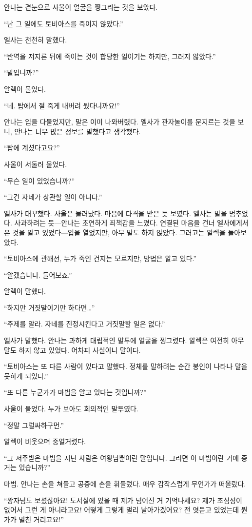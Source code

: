 안나는 곁눈으로 사울이 얼굴을 찡그리는 것을 보았다.

``난 그 일에도 토비아스를 죽이지 않았다.''

엘사는 천천히 말했다.

``반역을 저지른 뒤에 죽이는 것이 합당한 일이기는 하지만, 그러지 않았다.''

`` 말입니까?''

알렉이 물었다.

``네. 탑에서 절 죽게 내버려 뒀다니까요!''

안나는 입을 다물었지만, 말은 이미 나와버렸다. 엘사가 관자놀이를 문지르는 것을 보니, 안나는 너무 많은 정보를 말했다고 생각했다.

``탑에 계셨다고요?''

사울이 서둘러 물었다.

``무슨 일이 있었습니까?''

``그건 자네가 상관할 일이 아니다.''

엘사가 대꾸했다. 사울은 물러났다. 마음에 타격을 받은 듯 보였다. 엘사는 말을 멈추었다. 사과하려는 듯—안나는 초연하게 죄책감을 느꼈다. 연결된 마음을 건너 엘사에게서 온 것을 알고 있었다—입을 열었지만, 아무 말도 하지 않았다. 그러고는 알렉을 돌아보았다.

``토비아스에 관해선, 누가 죽인 건지는 모르지만, 방법은 알고 있다.''

``알겠습니다. 들어보죠.''

알렉이 말했다.

``하지만 거짓말이기만 하다면\ldots''

``주제를 알라. 자네를 진정시킨다고 거짓말할 일은 없다.''

엘사가 말했다. 안나는 과하게 대립적인 말투에 얼굴을 찡그렸다. 알렉은 여전히 아무 말도 하지 않고 있었다. 어차피 사실이니 말이다.

``토비아스는 또 다른 사람이 있다고 말했다. 정체를 말하려는 순간 봉인이 나타나 말을 못하게 되었다.''

``또 다른 누군가가 마법을 알고 있다는 것입니까?''

사울이 물었다. 누가 보아도 회의적인 말투였다.

``정말 그럴싸하구먼.''

알렉이 비웃으며 중얼거렸다.

``그 저주받은 마법을 지닌 사람은 여왕님뿐이란 말입니다. 그러면 이 마법이란 거에 증거는 있습니까?''

마법. 안나는 손을 쳐들고 공중에 손을 휘둘렀다. 매우 갑작스럽게 무언가가 떠올랐다.

``왕자님도 보셨잖아요! 도서실에 있을 때 제가 넘어진 거 기억나세요? 제가 조심성이 없어서 그런 게 아니라고요! 어떻게 그렇게 멀리 날아가겠어요? 전 엿듣고 있었는데 뭔가가 밀친 거리고요!''

